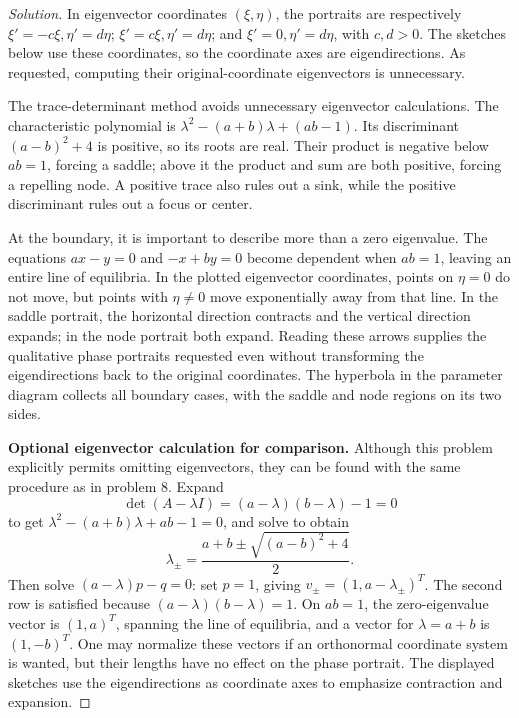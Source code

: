 \documentclass[10pt]{amsart}
\newenvironment{solution}
{\begin{proof}[Solution]}
{\end{proof}}
\begin{document}
\begin{enumerate}[label=\arabic*), leftmargin=*, itemsep=1em]
\begin{solution}
In eigenvector coordinates $(\xi,\eta)$, the portraits are respectively $\xi'=-c\xi,\eta'=d\eta$; $\xi'=c\xi,\eta'=d\eta$; and $\xi'=0,\eta'=d\eta$, with $c,d>0$. The sketches below use these coordinates, so the coordinate axes are eigendirections. As requested, computing their original-coordinate eigenvectors is unnecessary.

The trace-determinant method avoids unnecessary eigenvector calculations. The characteristic polynomial is $\lambda^2-(a+b)\lambda+(ab-1)$. Its discriminant $(a-b)^2+4$ is positive, so its roots are real. Their product is negative below $ab=1$, forcing a saddle; above it the product and sum are both positive, forcing a repelling node. A positive trace also rules out a sink, while the positive discriminant rules out a focus or center.

At the boundary, it is important to describe more than a zero eigenvalue. The equations $ax-y=0$ and $-x+by=0$ become dependent when $ab=1$, leaving an entire line of equilibria. In the plotted eigenvector coordinates, points on $\eta=0$ do not move, but points with $\eta\ne0$ move exponentially away from that line. In the saddle portrait, the horizontal direction contracts and the vertical direction expands; in the node portrait both expand. Reading these arrows supplies the qualitative phase portraits requested even without transforming the eigendirections back to the original coordinates. The hyperbola in the parameter diagram collects all boundary cases, with the saddle and node regions on its two sides.


\medskip\noindent\textbf{Optional eigenvector calculation for comparison.}
Although this problem explicitly permits omitting eigenvectors, they can be found with the same procedure as in problem 8. Expand
\[
\det(A-\lambda I)=(a-\lambda)(b-\lambda)-1=0
\]
to get $\lambda^2-(a+b)\lambda+ab-1=0$, and solve to obtain
\[
\lambda_\pm=\frac{a+b\pm\sqrt{(a-b)^2+4}}2.
\]
Then solve $(a-\lambda)p-q=0$: set $p=1$, giving $v_\pm=(1,a-\lambda_\pm)^T$. The second row is satisfied because $(a-\lambda)(b-\lambda)=1$. On $ab=1$, the zero-eigenvalue vector is $(1,a)^T$, spanning the line of equilibria, and a vector for $\lambda=a+b$ is $(1,-b)^T$. One may normalize these vectors if an orthonormal coordinate system is wanted, but their lengths have no effect on the phase portrait. The displayed sketches use the eigendirections as coordinate axes to emphasize contraction and expansion.


\end{solution}
\end{enumerate}
\end{document}
